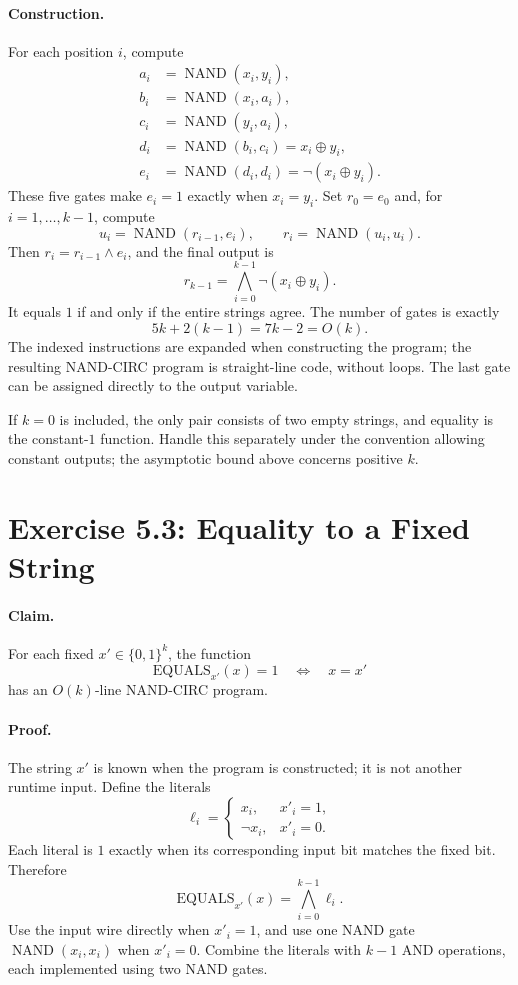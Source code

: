 \documentclass[UTF8,fontset=fandol,11pt,a4paper]{ctexart}
\newcommand{\bits}{\{0,1\}}
\newcommand{\NAND}{\operatorname{NAND}}
\begin{document}
\paragraph{Construction.}
For each position $i$, compute
\begin{align*}
 a_i&=\NAND(x_i,y_i),\\
 b_i&=\NAND(x_i,a_i),\\
 c_i&=\NAND(y_i,a_i),\\
 d_i&=\NAND(b_i,c_i)=x_i\oplus y_i,\\
 e_i&=\NAND(d_i,d_i)=\neg(x_i\oplus y_i).
\end{align*}
These five gates make $e_i=1$ exactly when $x_i=y_i$.
Set $r_0=e_0$ and, for $i=1,\ldots,k-1$, compute
\[
 u_i=\NAND(r_{i-1},e_i),\qquad r_i=\NAND(u_i,u_i).
\]
Then $r_i=r_{i-1}\land e_i$, and the final output is
\[
 r_{k-1}=\bigwedge_{i=0}^{k-1}\neg(x_i\oplus y_i).
\]
It equals $1$ if and only if the entire strings agree.
The number of gates is exactly
\[
 5k+2(k-1)=7k-2=O(k).
\]
The indexed instructions are expanded when constructing the program;
the resulting NAND-CIRC program is straight-line code, without loops.
The last gate can be assigned directly to the output variable.

If $k=0$ is included, the only pair consists of two empty strings,
and equality is the constant-$1$ function. Handle this separately
under the convention allowing constant outputs; the asymptotic bound
above concerns positive $k$.

\section{Exercise 5.3: Equality to a Fixed String}

\paragraph{Claim.}
For each fixed $x'\in\bits^k$, the function
\[
 \mathrm{EQUALS}_{x'}(x)=1\quad\Longleftrightarrow\quad x=x'
\]
has an $O(k)$-line NAND-CIRC program.

\paragraph{Proof.}
The string $x'$ is known when the program is constructed; it is not
another runtime input. Define the literals
\[
 \ell_i=
 \begin{cases}
  x_i,&x'_i=1,\\
  \neg x_i,&x'_i=0.
 \end{cases}
\]
Each literal is $1$ exactly when its corresponding input bit matches
the fixed bit. Therefore
\[
 \mathrm{EQUALS}_{x'}(x)=\bigwedge_{i=0}^{k-1}\ell_i.
\]
Use the input wire directly when $x'_i=1$, and use one NAND gate
$\NAND(x_i,x_i)$ when $x'_i=0$. Combine the literals with $k-1$
AND operations, each implemented using two NAND gates.
\end{document}
